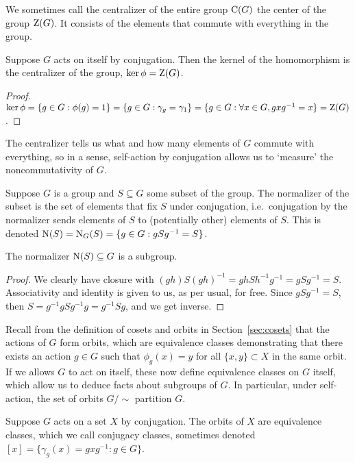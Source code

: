 \begin{definition}
    We sometimes call the centralizer of the entire group \(\operatorname{C}(G)\)
    the center of the group \(\operatorname{Z}(G)\).
    It consists of the elements that commute with everything in the group.
\end{definition}
\begin{proposition}
    Suppose \(G\) acts on itself by conjugation.
    Then the kernel of the homomorphism is the centralizer of the group,
    \(\ker\phi = \operatorname{Z}(G)\).
\end{proposition}
\begin{proof}
    \(\ker\phi = \{g \in G : \phi(g) = 1\}
    = \{g \in G : \gamma_g = \gamma_1\}
    = \{g \in G : \forall x \in G, gxg^{-1} = x\}
    = \operatorname{Z}(G)\).
\end{proof}
\begin{remark}
    The centralizer tells us what and how many elements of \(G\)
    commute with everything,
    so in a sense, self-action by conjugation
    allows us to `measure' the noncommutativity of \(G\).
\end{remark}

\begin{definition}
    Suppose \(G\) is a group
    and \(S \subseteq G\) some subset of the group.
    The normalizer of the subset
    is the set of elements that fix \(S\) under conjugation,
    i.e.\ conjugation by the normalizer sends elements of \(S\)
    to (potentially other) elements of \(S\).
    This is denoted \(\operatorname{N}(S) = \operatorname{N}_G(S)
    = \{g \in G : gSg^{-1} = S\}\).
\end{definition}
\begin{proposition}\label{prop:normalizer-subgroup}
    The normalizer \(\operatorname{N}(S) \subseteq G\) is a subgroup.
\end{proposition}
\begin{proof}
    We clearly have closure with
    \((gh)S{(gh)}^{-1} = ghSh^{-1}g^{-1} = gSg^{-1} = S\).
    Associativity and identity is given to us,
    as per usual, for free.
    Since \(gSg^{-1} = S\),
    then \(S = g^{-1}gSg^{-1}g = g^{-1}Sg\),
    and we get inverse.
\end{proof}

\begin{remark}
    Recall from the definition of cosets and orbits
    in Section~\ref{sec:cosets}
    that the actions of \(G\) form orbits,
    which are equivalence classes demonstrating that
    there exists an action \(g \in G\)
    such that \(\phi_g(x) = y\)
    for all \(\{x,y\} \subset X\) in the same orbit.
    If we allows \(G\) to act on itself,
    these now define equivalence classes on \(G\) itself,
    which allow us to deduce facts about subgroups of \(G\).
    In particular, under self-action,
    the set of orbits \(G/{\sim}\) partition \(G\).
\end{remark}
\begin{definition}
    Suppose \(G\) acts on a set \(X\) by conjugation.
    The orbits of \(X\) are equivalence classes,
    which we call conjugacy classes,
    sometimes denoted \([x] = \{\gamma_g(x) = gxg^{-1} : g \in G\}\).
\end{definition}

